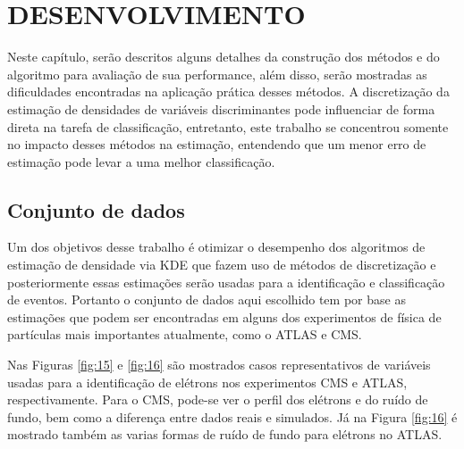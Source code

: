 \chapter{DESENVOLVIMENTO} \label{cap:desenvolvimento}

Neste capítulo, serão descritos alguns detalhes da construção dos métodos e do algoritmo para avaliação de sua performance, além disso, serão mostradas as dificuldades encontradas na aplicação prática desses métodos. A discretização da estimação de densidades de variáveis discriminantes pode influenciar de forma direta na tarefa de classificação, entretanto, este trabalho se concentrou somente no impacto desses métodos na estimação, entendendo que um menor erro de estimação pode levar a uma melhor classificação.

\section{Conjunto de dados}

Um dos objetivos desse trabalho é otimizar o desempenho dos algoritmos de estimação de densidade via KDE que fazem uso de métodos de discretização e posteriormente essas estimações serão usadas para a identificação e classificação de eventos. Portanto o conjunto de dados aqui escolhido tem por base as estimações que podem ser encontradas em alguns dos experimentos de física de partículas mais importantes atualmente, como o ATLAS e CMS.

Nas Figuras \ref{fig:15} e \ref{fig:16} são mostrados casos representativos de variáveis usadas para a identificação de elétrons nos experimentos CMS e ATLAS, respectivamente. Para o CMS, pode-se ver o perfil dos elétrons e do ruído de fundo, bem como a diferença entre dados reais e simulados. Já na Figura \ref{fig:16} é mostrado também as varias formas de ruído de fundo para elétrons no ATLAS.


